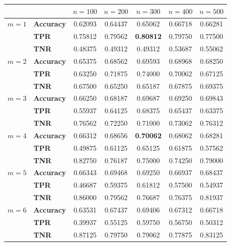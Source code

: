 \begin{figure}
    \centering
    \begin{tabular}{c|lccccc}
               &                   & $n=100$ & $n=200$ & $n=300$ & $n=400$ & $n=500$ \\
        \hline
        $m=1$  & \textbf{Accuracy} & 0.62093 & 0.64437 & 0.65062 & 0.66718 & 0.66281 \\
               & \textbf{TPR}      & 0.75812 & 0.79562 & \textbf{0.80812} & 0.79750 & 0.77500 \\
               & \textbf{TNR}      & 0.48375 & 0.49312 & 0.49312 & 0.53687 & 0.55062 \\
        \hline
        $m=2$  & \textbf{Accuracy} & 0.65375 & 0.68562 & 0.69593 & 0.68968 & 0.68250 \\
               & \textbf{TPR}      & 0.63250 & 0.71875 & 0.74000 & 0.70062 & 0.67125 \\
               & \textbf{TNR}      & 0.67500 & 0.65250 & 0.65187 & 0.67875 & 0.69375 \\
        \hline
        $m=3$  & \textbf{Accuracy} & 0.66250 & 0.68187 & 0.69687 & 0.69250 & 0.69843 \\
               & \textbf{TPR}      & 0.55937 & 0.64125 & 0.68375 & 0.65437 & 0.63375 \\
               & \textbf{TNR}      & 0.76562 & 0.72250 & 0.71000 & 0.73062 & 0.76312 \\
        \hline
        $m=4$  & \textbf{Accuracy} & 0.66312 & 0.68656 & \textbf{0.70062} & 0.68062 & 0.68281 \\
               & \textbf{TPR}      & 0.49875 & 0.61125 & 0.65125 & 0.61875 & 0.57562 \\
               & \textbf{TNR}      & 0.82750 & 0.76187 & 0.75000 & 0.74250 & 0.79000 \\
        \hline
        $m=5$  & \textbf{Accuracy} & 0.66343 & 0.69468 & 0.69250 & 0.66937 & 0.68437 \\
               & \textbf{TPR}      & 0.46687 & 0.59375 & 0.61812 & 0.57500 & 0.54937 \\
               & \textbf{TNR}      & 0.86000 & 0.79562 & 0.76687 & 0.76375 & 0.81937 \\
        \hline
        $m=6$  & \textbf{Accuracy} & 0.63531 & 0.67437 & 0.69406 & 0.67312 & 0.66718 \\
               & \textbf{TPR}      & 0.39937 & 0.55125 & 0.59750 & 0.56750 & 0.50312 \\
               & \textbf{TNR}      & 0.87125 & 0.79750 & 0.79062 & 0.77875 & 0.83125 \\

\end{tabular}
\end{figure}

